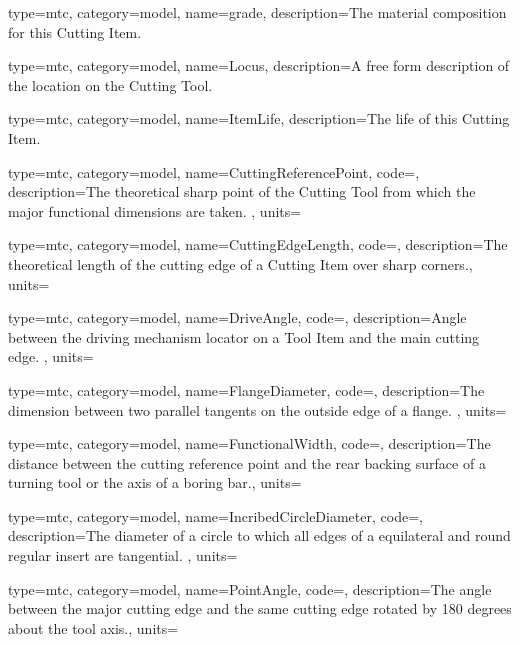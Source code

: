 {
  type=mtc,
  category=model,
  name={grade},
  description={The material composition for this Cutting Item.}
}



{
  type=mtc,
  category=model,
  name={Locus},
  description={A free form description of the location on the Cutting Tool.}
}


{
  type=mtc,
  category=model,
  name={ItemLife},
  description={The life of this Cutting Item.}
}


{
  type=mtc,
  category=model,
  name={CuttingReferencePoint},
  code=,
  description={The theoretical sharp point of the Cutting Tool from which the major functional dimensions are taken. },
  units=
}


{
  type=mtc,
  category=model,
  name={CuttingEdgeLength},
  code=,
  description={The theoretical length of the cutting edge of a Cutting Item over sharp corners.},
  units=
}


{
  type=mtc,
  category=model,
  name={DriveAngle},
  code=,
  description={Angle between the driving mechanism locator on a Tool Item and the main cutting edge. },
  units=
}


{
  type=mtc,
  category=model,
  name={FlangeDiameter},
  code=,
  description={The dimension between two parallel tangents on the outside edge of a flange. },
  units=
}


{
  type=mtc,
  category=model,
  name={FunctionalWidth},
  code=,
  description={The distance between the cutting reference point and the rear backing surface of a turning tool or the axis of a boring bar.},
  units=
}


{
  type=mtc,
  category=model,
  name={IncribedCircleDiameter},
  code=,
  description={The diameter of a circle to which all edges of a equilateral and round regular insert are tangential. },
  units=
}


{
  type=mtc,
  category=model,
  name={PointAngle},
  code=,
  description={The angle between the major cutting edge and the same cutting edge rotated by 180 degrees about the tool axis.},
  units=
}


